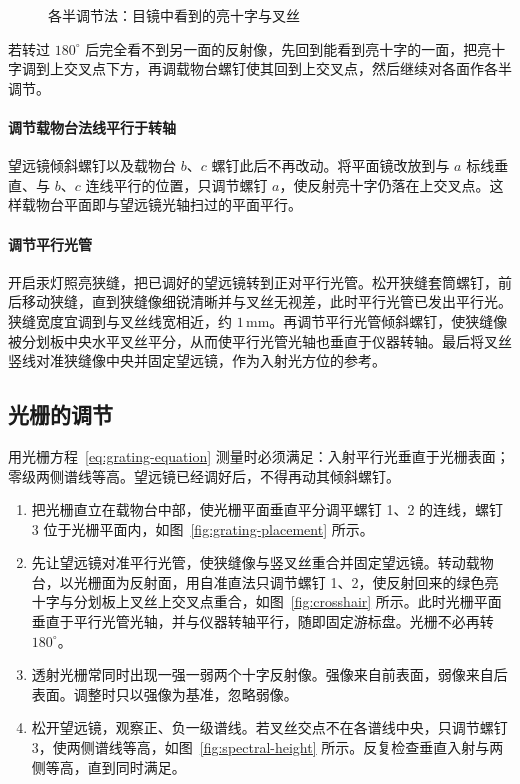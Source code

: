 \documentclass{../template/myrpt}
\begin{document}
\begin{figure}[!htbp]
  \centering
  
  \caption{各半调节法：目镜中看到的亮十字与叉丝}
  \label{fig:half-adjust}
\end{figure}

若转过 $180^\circ$ 后完全看不到另一面的反射像，先回到能看到亮十字的一面，把亮十字调到上交叉点下方，再调载物台螺钉使其回到上交叉点，然后继续对各面作各半调节。

\paragraph{调节载物台法线平行于转轴}
望远镜倾斜螺钉以及载物台 $b$、$c$ 螺钉此后不再改动。将平面镜改放到与 $a$ 标线垂直、与 $b$、$c$ 连线平行的位置，只调节螺钉 $a$，使反射亮十字仍落在上交叉点。这样载物台平面即与望远镜光轴扫过的平面平行。

\paragraph{调节平行光管}
开启汞灯照亮狭缝，把已调好的望远镜转到正对平行光管。松开狭缝套筒螺钉，前后移动狭缝，直到狭缝像细锐清晰并与叉丝无视差，此时平行光管已发出平行光。狭缝宽度宜调到与叉丝线宽相近，约 $1\,\si{\milli\metre}$。再调节平行光管倾斜螺钉，使狭缝像被分划板中央水平叉丝平分，从而使平行光管光轴也垂直于仪器转轴。最后将叉丝竖线对准狭缝像中央并固定望远镜，作为入射光方位的参考。

\subsection{光栅的调节}

用光栅方程~\eqref{eq:grating-equation} 测量时必须满足：入射平行光垂直于光栅表面；零级两侧谱线等高。望远镜已经调好后，不得再动其倾斜螺钉。

\begin{enumerate}[label=\arabic*)]
  \item 把光栅直立在载物台中部，使光栅平面垂直平分调平螺钉 1、2 的连线，螺钉 3 位于光栅平面内，如图~\ref{fig:grating-placement} 所示。
  \item 先让望远镜对准平行光管，使狭缝像与竖叉丝重合并固定望远镜。转动载物台，以光栅面为反射面，用自准直法只调节螺钉 1、2，使反射回来的绿色亮十字与分划板上叉丝上交叉点重合，如图~\ref{fig:crosshair} 所示。此时光栅平面垂直于平行光管光轴，并与仪器转轴平行，随即固定游标盘。光栅不必再转 $180^\circ$。
  \item 透射光栅常同时出现一强一弱两个十字反射像。强像来自前表面，弱像来自后表面。调整时只以强像为基准，忽略弱像。
  \item 松开望远镜，观察正、负一级谱线。若叉丝交点不在各谱线中央，只调节螺钉 3，使两侧谱线等高，如图~\ref{fig:spectral-height} 所示。反复检查垂直入射与两侧等高，直到同时满足。
\end{enumerate}
\end{document}
